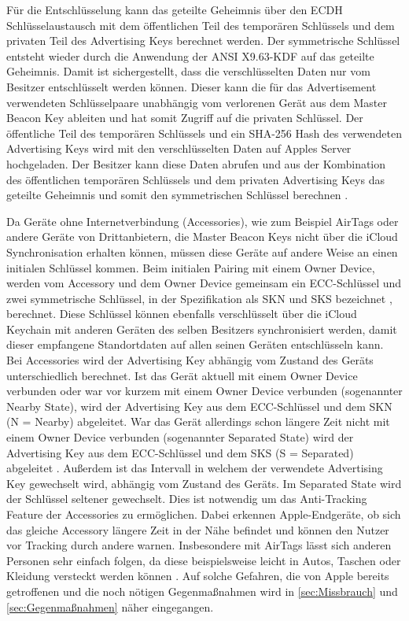 Für die Entschlüsselung kann das geteilte Geheimnis über den \ac{ECDH} Schlüsselaustausch mit dem öffentlichen Teil des temporären Schlüssels und dem privaten Teil des Advertising Keys berechnet werden.
Der symmetrische Schlüssel entsteht wieder durch die Anwendung der ANSI X9.63-\ac{KDF} auf das geteilte Geheimnis.
Damit ist sichergestellt, dass die verschlüsselten Daten nur vom Besitzer entschlüsselt werden können.
Dieser kann die für das Advertisement verwendeten Schlüsselpaare unabhängig vom verlorenen Gerät aus dem Master Beacon Key ableiten und hat somit Zugriff auf die privaten Schlüssel.
Der öffentliche Teil des temporären Schlüssels und ein \ac{SHA}-256 Hash des verwendeten Advertising Keys wird mit den verschlüsselten Daten auf Apples Server hochgeladen.
Der Besitzer kann diese Daten abrufen und aus der Kombination des öffentlichen temporären Schlüssels und dem privaten Advertising Keys das geteilte Geheimnis und somit den symmetrischen Schlüssel berechnen \cite{Heinrich_FindMy}.

Da Geräte ohne Internetverbindung (Accessories), wie zum Beispiel AirTags oder andere Geräte von Drittanbietern, die Master Beacon Keys nicht über die iCloud Synchronisation erhalten können, müssen diese Geräte auf andere Weise an einen initialen Schlüssel kommen.
Beim initialen Pairing mit einem Owner Device, werden vom Accessory und dem Owner Device gemeinsam ein \ac{ECC}-Schlüssel und zwei symmetrische Schlüssel, in der Spezifikation als SKN und SKS bezeichnet \cite{Apple_FindMySpec}, berechnet.
Diese Schlüssel können ebenfalls verschlüsselt über die iCloud Keychain mit anderen Geräten des selben Besitzers synchronisiert werden, damit dieser empfangene Standortdaten auf allen seinen Geräten entschlüsseln kann.
Bei Accessories wird der Advertising Key abhängig vom Zustand des Geräts unterschiedlich berechnet.
Ist das Gerät aktuell mit einem Owner Device verbunden oder war vor kurzem mit einem Owner Device verbunden (sogenannter Nearby State), wird der Advertising Key aus dem \ac{ECC}-Schlüssel und dem SKN (N = Nearby) abgeleitet.
War das Gerät allerdings schon längere Zeit nicht mit einem Owner Device verbunden (sogenannter Separated State) wird der Advertising Key aus dem \ac{ECC}-Schlüssel und dem SKS (S = Separated) abgeleitet \cite{Apple_FindMySpec}.
Außerdem ist das Intervall in welchem der verwendete Advertising Key gewechselt wird, abhängig vom Zustand des Geräts.
Im Separated State wird der Schlüssel seltener gewechselt.
Dies ist notwendig um das Anti-Tracking Feature der Accessories zu ermöglichen.
Dabei erkennen Apple-Endgeräte, ob sich das gleiche Accessory längere Zeit in der Nähe befindet und können den Nutzer vor Tracking durch andere warnen.
Insbesondere mit AirTags lässt sich anderen Personen sehr einfach folgen, da diese beispielsweise leicht in Autos, Taschen oder Kleidung versteckt werden können \cite{Mayberry_Tracking}.
Auf solche Gefahren, die von Apple bereits getroffenen und die noch nötigen Gegenmaßnahmen wird in \autoref{sec:Missbrauch} und \autoref{sec:Gegenmaßnahmen} näher eingegangen.


